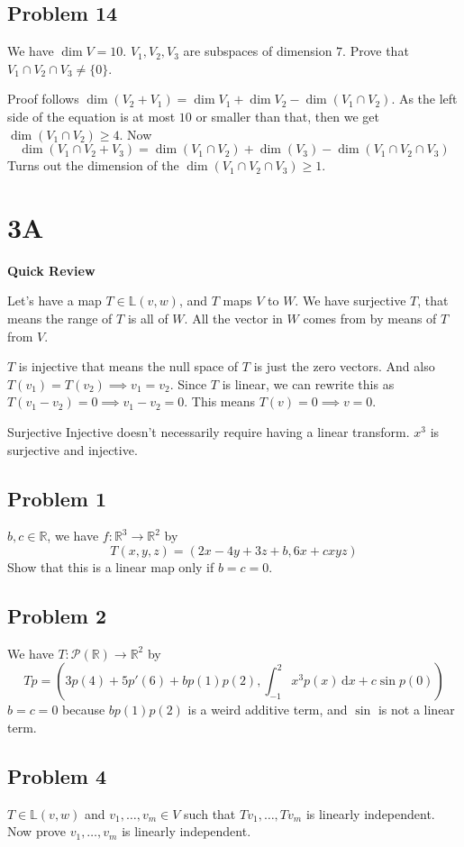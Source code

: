 \documentclass[letter]{article}
\begin{document}
\subsection{Problem 14} 
We have $\dim V = 10$. $V_1,V_2, V_3$ are subspaces of dimension $ 7$. Prove that $V_1 \cap V_2 \cap  V_3 \neq \{0\} $.

Proof follows $\dim(V_2 + V_1) = \dim V_1 + \dim V_2 - \dim(V_1 \cap  V_2)$. As the left side of the equation is at most $10$ or smaller than that, then we get $\dim (V_1 \cap V_2) \ge 4$. Now
\[
\dim (V_1 \cap  V_2 + V_3) = \dim(V_1 \cap  V_2) + \dim (V_3) - \dim(V_1 \cap  V_2 \cap V_3)
\] 
Turns out the dimension of the $\dim(V_1 \cap  V_2 \cap  V_3) \ge 1$.

\section{3A} 

\textbf{Quick Review}

Let's have a map $T \in  \mathbb{L}(v,w)$, and $T$ maps $V$ to $W$. We have surjective $T$, that means the range of $T$ is all of $W$. All the vector in $W$ comes from by means of $T$ from $V$. 

$T$ is injective that means the null space of $T$ is just the zero vectors. And also $T(v_1) = T(v_2) \implies v_1 = v_2$. Since $T$ is linear, we can rewrite this as $T(v_1 - v_2) = 0 \implies v_1 - v_2 = 0$. This means $T(v) = 0 \implies v = 0$. 

Surjective Injective doesn't necessarily require having a linear transform. $x^3$ is surjective and injective.

\subsection{Problem 1}
$b,c \in \mathbb{R}$, we have $f:\mathbb{R}^{3} \to \mathbb{R}^2$ by 
\[
T(x,y,z) = (2x-4y+3z+b,6x+cxyz)
\]
Show that this is a linear map only if $b=c=0$.

\subsection{Problem 2}
We have $T: \mathcal{P}(\mathbb{R})\to \mathbb{R}^2$  by 
\[
	Tp = \left(3p(4)+5p'(6)+bp(1)p(2), \int_{-1}^{2} x^3 p(x) \, \mathrm{d} x + c \sin p(0)\right)
\]
$b=c=0$ because $bp(1)p(2)$ is a weird additive term, and $\sin $ is not a linear term. 

\subsection{Problem 4} 
$T \in \mathbb{L}(v,w)$ and $v_1, \ldots, v_m \in V$ such that $Tv_1, \ldots, Tv_m$ is linearly independent. Now prove $v_1, \ldots, v_m $ is linearly independent. 
\end{document}

